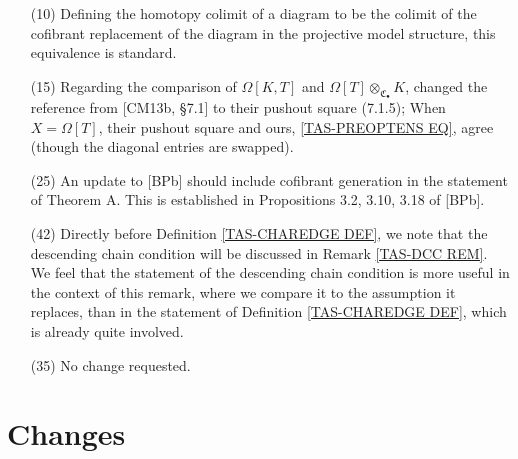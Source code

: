 \documentclass[a4paper,10pt
]{article}%
\numberwithin{equation}{section}
\numberwithin{figure}{section}
\theoremstyle{definition} %
\DeclareMathOperator{\colim}{colim}%
\newcommand{\1}{\ensuremath{\mathbbm 1}}%
\begin{document}
\begin{enumerate}
\item[(10)] Defining the homotopy colimit of a diagram to be the colimit of the cofibrant replacement of the diagram
        in the projective model structure, this equivalence is standard.
\item[(15)] Regarding the comparison of $\Omega[K,T]$ and $\Omega[T] \otimes_{\mathfrak C_\bullet} K$,
        changed the reference from [CM13b, \S 7.1] to their pushout square (7.1.5);
        When $X = \Omega[T]$, their pushout square and ours, \eqref{TAS-PREOPTENS EQ}, agree (though the diagonal entries are swapped).
\item[(25)] An update to [BPb] should include cofibrant generation in the statement of Theorem A.
        This is established in Propositions 3.2, 3.10, 3.18 of [BPb].
\item[(42)] Directly before Definition \ref{TAS-CHAREDGE DEF}, we note that the descending chain condition will be discussed in Remark \ref{TAS-DCC REM}.
        We feel that the statement of the descending chain condition is more useful in the context of this remark,
        where we compare it to the assumption it replaces,
        than in the statement of Definition \ref{TAS-CHAREDGE DEF}, which is already quite involved.
\item[(35)] No change requested.
\end{enumerate}

\section{Changes}
\end{document}
